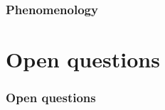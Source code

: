 \documentclass[aspectratio=169,11pt,usenames,dvipsnames]{beamer}
\begin{document}

\begin{frame}
    \frametitle{Phenomenology}
\end{frame}


\section{Open questions}



\begin{frame}
    \frametitle{Open questions}
\end{frame}
\end{document}
